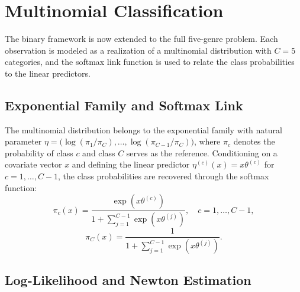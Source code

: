 \section{Multinomial Classification}

The binary framework is now extended to the full five-genre problem. Each observation is modeled as a realization of a multinomial distribution with \(C = 5\) categories, and the softmax link function is used to relate the class probabilities to the linear predictors.

\subsection{Exponential Family and Softmax Link}

The multinomial distribution belongs to the exponential family with natural parameter
\(\eta = \bigl(\log(\pi_1/\pi_C),\ldots,\log(\pi_{C-1}/\pi_C)\bigr)\),
where \(\pi_c\) denotes the probability of class \(c\) and class \(C\) serves as the reference. Conditioning on a covariate vector \(x\) and defining the linear predictor \(\eta^{(c)}(x) = x\theta^{(c)}\) for \(c = 1,\ldots,C-1\), the class probabilities are recovered through the softmax function:
\begin{equation}
\pi_c(x) = \frac{\exp(x\theta^{(c)})}{1 + \sum_{j=1}^{C-1}\exp(x\theta^{(j)})},
\quad c = 1,\ldots,C-1,
\label{eq:softmax}
\end{equation}
\begin{equation}
\pi_C(x) = \frac{1}{1 + \sum_{j=1}^{C-1}\exp(x\theta^{(j)})}.
\label{eq:softmax_ref}
\end{equation}

\subsection{Log-Likelihood and Newton Estimation}


